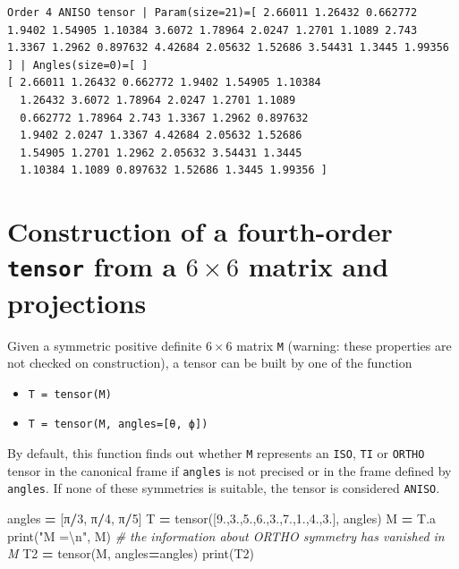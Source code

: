 \documentclass[
  a4paper,
  numbers=noendperiod,
  DIV=12]{scrreprt}
\newenvironment{Shaded}{\begin{snugshade}}{\end{snugshade}}
\newcommand{\BuiltInTok}[1]{#1}
\newcommand{\CharTok}[1]{\textcolor[rgb]{0.31,0.60,0.02}{#1}}
\newcommand{\CommentTok}[1]{\textcolor[rgb]{0.56,0.35,0.01}{\textit{#1}}}
\newcommand{\DecValTok}[1]{\textcolor[rgb]{0.00,0.00,0.81}{#1}}
\newcommand{\FloatTok}[1]{\textcolor[rgb]{0.00,0.00,0.81}{#1}}
\newcommand{\NormalTok}[1]{#1}
\newcommand{\OperatorTok}[1]{\textcolor[rgb]{0.81,0.36,0.00}{\textbf{#1}}}
\newcommand{\StringTok}[1]{\textcolor[rgb]{0.31,0.60,0.02}{#1}}
\providecommand{\tightlist}{%
  \setlength{\itemsep}{0pt}\setlength{\parskip}{0pt}}\usepackage{longtable,booktabs,array}
\begin{document}
\begin{verbatim}
Order 4 ANISO tensor | Param(size=21)=[ 2.66011 1.26432 0.662772 1.9402 1.54905 1.10384 3.6072 1.78964 2.0247 1.2701 1.1089 2.743 1.3367 1.2962 0.897632 4.42684 2.05632 1.52686 3.54431 1.3445 1.99356 ] | Angles(size=0)=[ ]
[ 2.66011 1.26432 0.662772 1.9402 1.54905 1.10384 
  1.26432 3.6072 1.78964 2.0247 1.2701 1.1089 
  0.662772 1.78964 2.743 1.3367 1.2962 0.897632 
  1.9402 2.0247 1.3367 4.42684 2.05632 1.52686 
  1.54905 1.2701 1.2962 2.05632 3.54431 1.3445 
  1.10384 1.1089 0.897632 1.52686 1.3445 1.99356 ]
\end{verbatim}

\section{\texorpdfstring{Construction of a fourth-order \texttt{tensor}
from a \(6×6\) matrix and
projections}{Construction of a fourth-order tensor from a 6×6 matrix and projections}}\label{construction-of-a-fourth-order-tensor-from-a-66-matrix-and-projections}

Given a symmetric positive definite \(6×6\) matrix \texttt{M} (warning:
these properties are not checked on construction), a tensor can be built
by one of the function

\begin{itemize}
\tightlist
\item
  \texttt{T\ =\ tensor(M)}
\item
  \texttt{T\ =\ tensor(M,\ angles={[}θ,\ ϕ{]})}
\end{itemize}

By default, this function finds out whether \texttt{M} represents an
\texttt{ISO}, \texttt{TI} or \texttt{ORTHO} tensor in the canonical
frame if \texttt{angles} is not precised or in the frame defined by
\texttt{angles}. If none of these symmetries is suitable, the tensor is
considered \texttt{ANISO}.

\begin{Shaded}
\begin{Highlighting}[]
\NormalTok{angles }\OperatorTok{=}\NormalTok{ [π}\OperatorTok{/}\DecValTok{3}\NormalTok{, π}\OperatorTok{/}\DecValTok{4}\NormalTok{, π}\OperatorTok{/}\DecValTok{5}\NormalTok{]}
\NormalTok{T }\OperatorTok{=}\NormalTok{ tensor([}\FloatTok{9.}\NormalTok{,}\FloatTok{3.}\NormalTok{,}\FloatTok{5.}\NormalTok{,}\FloatTok{6.}\NormalTok{,}\FloatTok{3.}\NormalTok{,}\FloatTok{7.}\NormalTok{,}\FloatTok{1.}\NormalTok{,}\FloatTok{4.}\NormalTok{,}\FloatTok{3.}\NormalTok{], angles)}
\NormalTok{M }\OperatorTok{=}\NormalTok{ T.a}
\BuiltInTok{print}\NormalTok{(}\StringTok{"M =}\CharTok{\textbackslash{}n}\StringTok{"}\NormalTok{, M) }\CommentTok{\# the information about ORTHO symmetry has vanished in M}
\NormalTok{T2 }\OperatorTok{=}\NormalTok{ tensor(M, angles}\OperatorTok{=}\NormalTok{angles)}
\BuiltInTok{print}\NormalTok{(T2)}
\end{Highlighting}
\end{Shaded}
\end{document}

